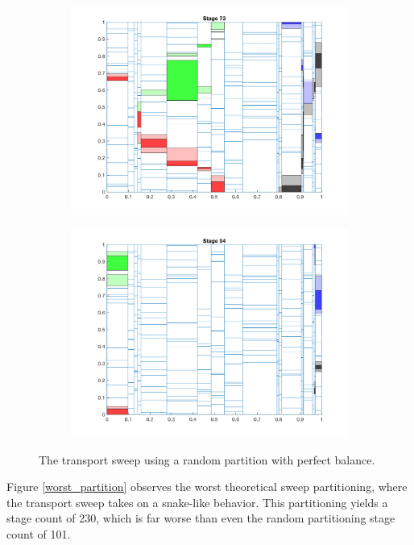 \documentclass[letterpaper]{mandc2019}
\begin{document}
\begin{figure}[H]
\begin{subfigure}{0.49\textwidth}
  \includegraphics[scale=0.5]{figures/random_partition_3.png}
  \end{subfigure}
  \begin{subfigure}{0.49\textwidth}
  \includegraphics[scale=0.5]{figures/random_partition_4.png}
  \end{subfigure}
  \caption{The transport sweep using a random partition with perfect balance.}
  \label{random_partition}
\end{figure}

Figure \ref{worst_partition} observes the worst theoretical sweep partitioning, where the transport sweep takes on a snake-like behavior. This partitioning yields a stage count of 230, which is far worse than even the random partitioning stage count of 101.
\end{document}
